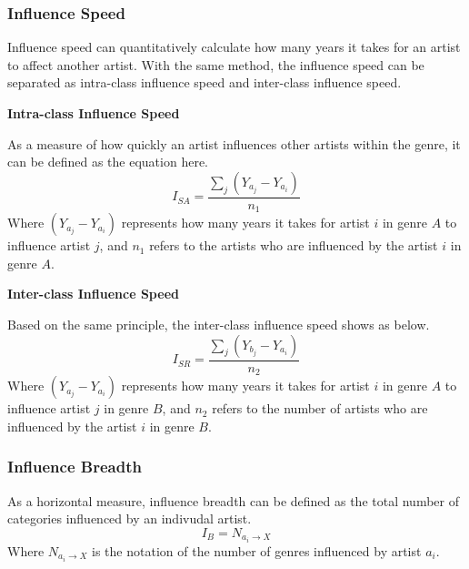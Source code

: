 \documentclass{mcmthesis}
\begin{document}
\subsubsection{Influence Speed}
Influence speed can quantitatively calculate how many years it takes for an artist to affect another artist. With the same method, the influence speed can be separated as intra-class influence speed and inter-class influence speed. 

\noindent%
\textbf{Intra-class Influence Speed}

As a measure of how quickly an artist influences other artists within the genre, it can be defined as the equation here.
\begin{equation}
{I_{SA}} = \frac{{\sum\limits_j {({Y_{{a_j}}} - {Y_{{a_i}}})} }}{n_{1}}
\end{equation}
Where ${({Y_{{a_j}}} - {Y_{{a_i}}})}$ represents how many years it takes for artist $i$ in genre $A$ to influence artist $j$, and $n_{1}$ refers to the artists who are influenced by the artist $i$ in genre $A$.

\noindent%
\textbf{Inter-class Influence Speed}

Based on the same principle, the inter-class influence speed shows as below.
\begin{equation}
{I_{SR}} = \frac{{\sum\limits_j {({Y_{{b_j}}} - {Y_{{a_i}}})} }}{n_{2}}
\end{equation}
Where ${({Y_{{a_j}}} - {Y_{{a_i}}})}$ represents how many years it takes for artist $i$ in genre $A$ to influence artist $j$ in genre $B$, and $n_{2}$ refers to the number of artists who are influenced by the artist $i$ in genre $B$.

\subsubsection{Influence Breadth}
As a horizontal measure, influence breadth can be defined as the total number of categories influenced by an indivudal artist.
\begin{equation}
{I_B} = {N_{{a_i} \to X}}
\end{equation}
Where ${N_{{a_i} \to X}}$ is the notation of the number of genres influenced by artist ${{a_i}}$.
\end{document}
